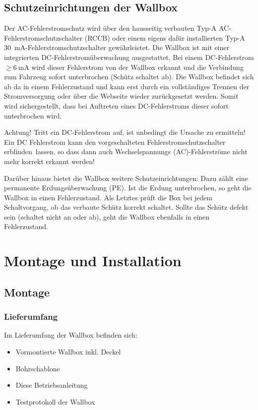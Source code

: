 \documentclass[a4paper,10pt]{article}
\newcommand{\hint}[1]{\begin{tcolorbox}[colback=boxgray,colframe=black,coltext=
white,title=Hinweis]#1\end{tcolorbox}}
\begin{document}
\begin{multicols*}{2}
	\subsection{Schutzeinrichtungen der Wallbox}
	Der AC-Fehlerstromschutz wird über den hausseitig verbauten
	Typ-A AC-Fehlerstromschutzschalter (RCCB) oder einem eigens dafür installierten
	Typ-A \SI{30}{\milli\ampere}-Fehlerstromschutzschalter gewährleistet. Die Wallbox ist
	mit einer integrierten DC-Fehlerstromüberwachung ausgestattet. 
	Bei einem DC-Fehlerstrom $\geq \SI{6}{\milli\ampere}$ wird dieser
	Fehlerstrom von der Wallbox erkannt und die Verbindung zum Fahrzeug sofort
	unterbrochen (Schütz schaltet ab). Die Wallbox befindet sich ab da in einem
	Fehlerzustand und kann erst durch ein vollständiges Trennen der
	Stromversorgung oder über die Webseite wieder zurückgesetzt werden. 
	Somit wird sichergestellt, dass bei Auftreten eines
	DC-Fehlerstroms dieser sofort unterbrochen wird.
	\hint{Achtung! Tritt ein DC-Fehlerstrom auf, ist unbedingt die Ursache zu
	ermitteln! Ein DC Fehlerstrom kann den vorgeschalteten Fehlerstromschutzschalter
	\glqq erblinden\grqq~lassen, so dass dann auch Wechselspannungs
	(AC)-Fehlerströme nicht mehr korrekt erkannt werden!}

	Darüber hinaus bietet die Wallbox weitere Schutzeinrichtungen: Dazu zählt eine
	permanente Erdungsüberwachung (PE). Ist die Erdung unterbrochen, so geht die
	Wallbox in einen Fehlerzustand. Als Letztes prüft die Box bei jedem
	Schaltvorgang, ob das verbaute Schütz korrekt schaltet. Sollte das
	Schütz defekt sein (schaltet nicht an oder ab), geht die Wallbox
	ebenfalls in einen Fehlerzustand.

	\section{Montage und Installation}
	\subsection{Montage}
	\subsubsection{Lieferumfang}
	Im Lieferumfang der Wallbox befinden sich:
	\begin{itemize}
		\item Vormontierte Wallbox inkl. Deckel
		\item Bohrschablone
		\item Diese Betriebsanleitung
		\item Testprotokoll der Wallbox
	\end{itemize}


\end{multicols*}
\end{document}
